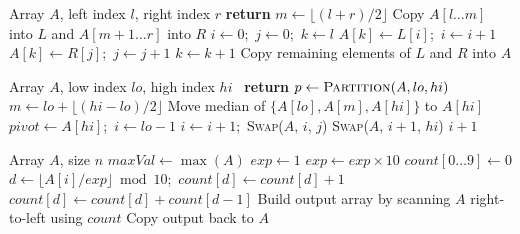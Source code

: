 \documentclass[11pt,a4paper]{article}
\begin{document}
\begin{algorithm}[H]
\caption{Merge Sort}
\begin{algorithmic}[1]
\Require Array $A$, left index $l$, right index $r$
  \State \textbf{return} 
\EndIf
\State $m \gets \lfloor (l + r) / 2 \rfloor$
\State {}
\State {}
\State {}
\Statex
{}
  \State Copy $A[l\ldots m]$ into $L$ and $A[m+1\ldots r]$ into $R$
  \State $i \gets 0$;\ $j \gets 0$;\ $k \gets l$
      \State $A[k] \gets L[i]$;\ $i \gets i+1$
    \Else
      \State $A[k] \gets R[j]$;\ $j \gets j+1$
    \EndIf
    \State $k \gets k+1$
  \EndWhile
  \State Copy remaining elements of $L$ and $R$ into $A$
\EndProcedure
\end{algorithmic}
\end{algorithm}

\begin{algorithm}[H]
\caption{Quick Sort (median-of-three pivot)}
\begin{algorithmic}[1]
\Require Array $A$, low index $lo$, high index $hi$
\ \textbf{return} \EndIf
\State $p \gets \Call{Partition}{A, lo, hi}$
\State {}
\State {}
\Statex
{}
  \State $m \gets lo + \lfloor (hi - lo) / 2 \rfloor$
  \State Move median of $\{A[lo], A[m], A[hi]\}$ to $A[hi]$ 
  \State $\textit{pivot} \gets A[hi]$;\ $i \gets lo - 1$
      \State $i \gets i+1$;\ \textsc{Swap}($A$, $i$, $j$)
    \EndIf
  \EndFor
  \State \textsc{Swap}($A$, $i+1$, $hi$)
  \State \Return $i+1$
\EndProcedure
\end{algorithmic}
\end{algorithm}

\begin{algorithm}[H]
\caption{Radix Sort (LSD, base 10)}
\begin{algorithmic}[1]
\Require Array $A$, size $n$
\State $\textit{maxVal} \gets \max(A)$
\State $\textit{exp} \gets 1$
  \State {}
  \State $\textit{exp} \gets \textit{exp} \times 10$
\EndWhile
\Statex
{}
  \State $\textit{count}[0\ldots9] \gets 0$
    \State $d \gets \lfloor A[i] / \textit{exp} \rfloor \bmod 10$;\ $\textit{count}[d] \gets \textit{count}[d]+1$
  \EndFor
    \State $\textit{count}[d] \gets \textit{count}[d] + \textit{count}[d-1]$ 
  \EndFor
  \State Build output array by scanning $A$ right-to-left using $\textit{count}$
  \State Copy output back to $A$
\EndProcedure
\end{algorithmic}
\end{algorithm}
\end{document}
